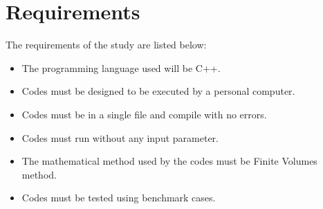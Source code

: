 \section{Requirements}
The requirements of the study are listed below:
\begin{itemize}
\item The programming language used will be C++.
\item Codes must be designed to be executed by a personal computer.
\item Codes must be in a single file and compile with no errors.
\item Codes must run without any input parameter.
\item The mathematical method used by the codes must be Finite Volumes method.
\item Codes must be tested using benchmark cases.
\end{itemize}